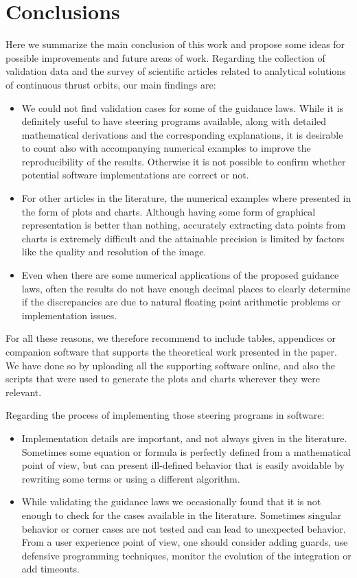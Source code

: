 \chapter{Conclusions} \label{conclusions}

Here we summarize the main conclusion of this work and propose some ideas for possible improvements and future areas of work. Regarding the collection of validation data and the survey of scientific articles related to analytical solutions of continuous thrust orbits, our main findings are:

\begin{itemize}
\item We could not find validation cases for some of the guidance laws. While it is definitely useful to have steering programs available, along with detailed mathematical derivations and the corresponding explanations, it is desirable to count also with accompanying numerical examples to improve the reproducibility of the results. Otherwise it is not possible to confirm whether potential software implementations are correct or not.
%
\item For other articles in the literature, the numerical examples where presented in the form of plots and charts. Although having some form of graphical representation is better than nothing, accurately extracting data points from charts is extremely difficult and the attainable precision is limited by factors like the quality and resolution of the image.
%
\item Even when there are some numerical applications of the proposed guidance laws, often the results do not have enough decimal places to clearly determine if the discrepancies are due to natural floating point arithmetic problems or implementation issues.
\end{itemize}

For all these reasons, we therefore recommend to include tables, appendices or companion software that supports the theoretical work presented in the paper. We have done so by uploading all the supporting software online, and also the scripts that were used to generate the plots and charts wherever they were relevant.

Regarding the process of implementing those steering programs in software:

\begin{itemize}
\item Implementation details are important, and not always given in the literature. Sometimes some equation or formula is perfectly defined from a mathematical point of view, but can present ill-defined behavior that is easily avoidable by rewriting some terms or using a different algorithm.
%
\item While validating the guidance laws we occasionally found that it is not enough to check for the cases available in the literature. Sometimes singular behavior or corner cases are not tested and can lead to unexpected behavior. From a user experience point of view, one should consider adding guards, use defensive programming techniques, monitor the evolution of the integration or add timeouts.
\end{itemize}

